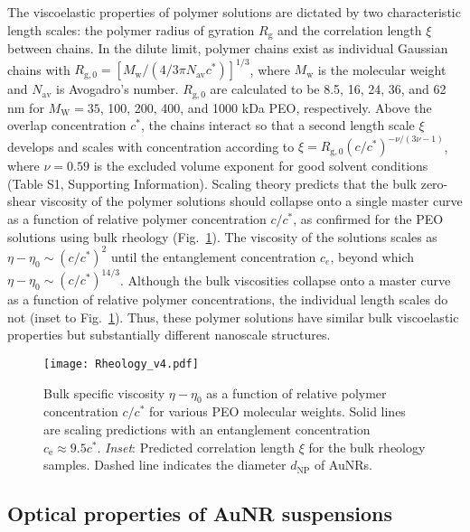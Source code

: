 \documentclass[journal=jacsat, superscriptaddress]{achemso}
\def\EDITS#1{{\color{black}#1}}
\def\EDITS#1{#1}
\begin{document}
The viscoelastic properties of polymer solutions are dictated by two characteristic length scales: the polymer radius of gyration $R_\mathrm{g}$ and the correlation length $\xi$ between chains. In the dilute limit, polymer chains exist as individual Gaussian chains with $R_\mathrm{g,0} = \left[ M_\mathrm{w}/(4/3\pi N_\mathrm{av}c^*) \right]^{1/3}$, where $M_\mathrm{w}$ is the molecular weight and $N_\mathrm{av}$ is Avogadro's number. \EDITS{$R_\mathrm{g,0}$ are calculated to be 8.5, 16, 24, 36, and 62 nm for $M_\mathrm{W} = 35$, 100, 200, 400, and 1000 kDa PEO, respectively.} Above the overlap concentration $c^*$, the chains interact so that a second length scale $\xi$ develops and scales with concentration according to $\xi = R_\mathrm{g,0}(c/c^*)^{-\nu/(3\nu-1)}$, where $\nu = 0.59$ is the excluded volume exponent for good solvent conditions \EDITS{(Table S1, Supporting Information)}. Scaling theory\cite{Rubinstein2003} predicts that the bulk zero-shear viscosity of the polymer solutions should collapse onto a single master curve as a function of relative polymer concentration $c/c^*$, as confirmed for the PEO solutions using bulk rheology (Fig.\ \ref{fig:Rheology}). The viscosity of the solutions scales as $\eta-\eta_0 \sim (c/c^*)^2$ until the entanglement concentration $c_e$, beyond which $\eta-\eta_0 \sim (c/c^*)^{14/3}$. Although the bulk viscosities collapse onto a master curve as a function of relative polymer concentrations, the individual length scales do not (inset to Fig.\ \ref{fig:Rheology}). Thus, these polymer solutions have similar bulk viscoelastic properties but substantially different nanoscale structures.

\begin{figure}[ht!]
\texttt{[image: Rheology\_v4.pdf]}
\caption{\label{fig:Rheology} Bulk specific viscosity $\eta - \eta_0$ as a function of relative polymer concentration $c/c^*$ for various PEO molecular weights. Solid lines are scaling predictions\cite{Rubinstein2003} with an entanglement concentration $c_\mathrm{e} \approx 9.5 c^*$. \textit{Inset}: Predicted correlation length $\xi$ for the bulk rheology samples. Dashed line indicates the diameter $d_\mathrm{NP}$ of AuNRs.}
\end{figure}

\subsection{Optical properties of AuNR suspensions}
\end{document}
